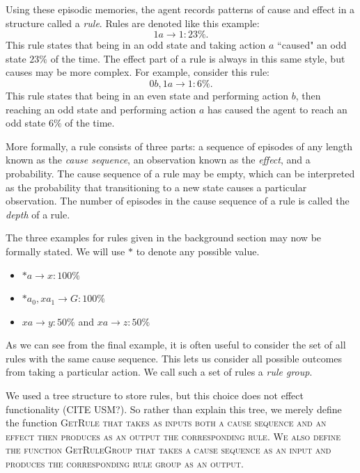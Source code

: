 \documentclass[letterpaper]{article} %
\begin{document}
Using these episodic memories, the agent records patterns of cause and effect in a structure called a \textit{rule}. Rules are denoted like this example: $$1a \rightarrow 1: 23\%.$$ This rule states that being in an odd state and taking action $a$ ``caused" an odd state $23\%$ of the time. The effect part of a rule is always in this same style, but causes may be more complex. For example, consider this rule: $$0b,1a \rightarrow 1: 6\%.$$ 
This rule states that being in an even state and performing action $b$, then reaching an odd state and performing action $a$ has caused the agent to reach an odd state $6\%$ of the time.

More formally, a rule consists of three parts: a sequence of episodes of any length known as the \emph{cause sequence}, an observation known as the \emph{effect}, and a probability. The cause sequence of a rule may be empty, which can be interpreted as the probability  that transitioning to a new state causes a particular observation. The number of episodes in the cause sequence of a rule is called the \textit{depth} of a rule.

The three examples for rules given in the background section may now be formally stated. We will use $*$ to denote any possible value.
\begin{itemize}
	\item $*a \rightarrow x: 100\%$
	\item $*a_0, xa_1 \rightarrow G: 100\%$
	\item $xa \rightarrow y: 50\%$ and $xa \rightarrow z: 50\%$
\end{itemize}
As we can see from the final example, it is often useful to consider the set of all rules with the same cause sequence. This lets us consider all possible outcomes from taking a particular action. We call such a set of rules a \textit{rule group}.

We used a tree structure to store rules, but this choice does not effect functionality (CITE USM?). So rather than explain this tree, we merely define the function \scshape GetRule \normalfont that takes as inputs both a cause sequence and an effect then produces as an output the corresponding rule. We also define the function \scshape GetRuleGroup \normalfont that takes  a cause sequence as an input and produces the corresponding rule group as an output.
\end{document}
